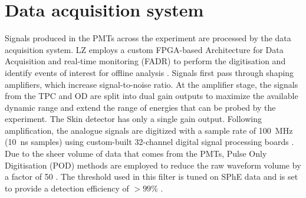 \section{Data acquisition system}\label{sec:LZ/LZDAQ}
Signals produced in the PMTs across the experiment are processed by the data acquisition system. LZ employs a custom FPGA-based Architecture for Data Acquisition and real-time monitoring (FADR) to perform the digitisation and identify events of interest for offline analysis \cite{LZ:2024bvw,Druszkiewicz:2015pcl}. 
Signals first pass through shaping amplifiers, which increase signal-to-noise ratio. At the amplifier stage, the signals from the TPC and OD are split into dual gain outputs to maximize the available dynamic range and extend the range of energies that can be probed by the experiment. The Skin detector has only a single gain output. Following amplification, the analogue signals are digitized with a sample rate of 100~MHz (10~ns samples) using custom-built 32-channel digital signal processing boards \cite{Druszkiewicz:2015pcl}. Due to the sheer volume of data that comes from the PMTs, Pulse Only Digitisation (POD) methods are employed to reduce the raw waveform volume by a factor of 50 \cite{LZTDR}. The threshold used in this filter is tuned on SPhE data and is set to provide a detection efficiency of $>99\%$ \cite{LZ:2024bvw}. 

